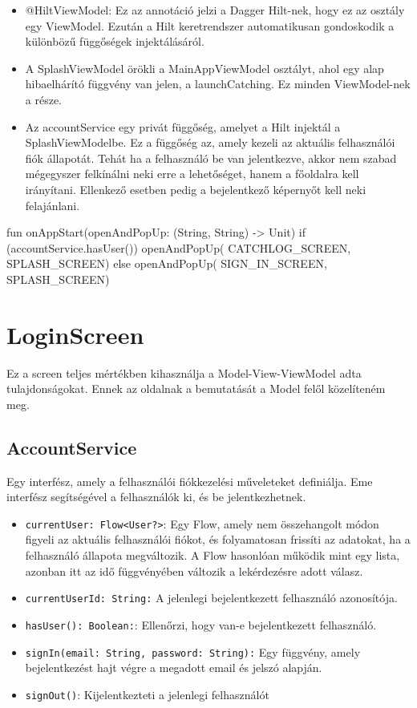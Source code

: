 \begin{itemize}
    \item @HiltViewModel: Ez az annotáció jelzi a Dagger Hilt-nek, hogy ez az osztály egy ViewModel. Ezután a Hilt keretrendszer automatikusan gondoskodik a különbözű függőségek injektálásáról.
    \item A SplashViewModel örökli a MainAppViewModel osztályt, ahol egy alap hibaelhárító függvény van jelen, a launchCatching. Ez minden ViewModel-nek a része.
    \item Az accountService egy privát függőség, amelyet a Hilt injektál a SplashViewModelbe.
    Ez a függőség az, amely kezeli az aktuális felhasználói fiók állapotát. Tehát ha a felhasználó be van jelentkezve, akkor nem szabad mégegyszer felkínálni neki erre a lehetőséget, hanem a főoldalra kell irányítani. Ellenkező esetben pedig a bejelentkező képernyőt kell neki felajánlani.
    
\end{itemize}

\begin{java}[caption = {onAppStart függvény deklarációja.}]
fun onAppStart(openAndPopUp: (String, String) -> Unit) {
    if (accountService.hasUser()) openAndPopUp(
    CATCHLOG_SCREEN, SPLASH_SCREEN)
    else openAndPopUp(
    SIGN_IN_SCREEN, SPLASH_SCREEN)
}
\end{java}

\section{LoginScreen}

Ez a screen teljes mértékben kihasználja a Model-View-ViewModel adta tulajdonságokat.
Ennek az oldalnak a bemutatását a Model felől közelíteném meg.

\subsection{AccountService}

Egy interfész, amely a felhasználói fiókkezelési műveleteket definiálja. Eme interfész segítségével a felhasználók ki, és be jelentkezhetnek.

\begin{itemize}
    \item \texttt{currentUser: Flow<User?>}: Egy Flow, amely nem összehangolt módon figyeli az aktuális felhasználói fiókot, és folyamatosan frissíti az adatokat, ha a felhasználó állapota megváltozik. A Flow hasonlóan működik mint egy lista, azonban itt az idő függvényében változik a lekérdezésre adott válasz.
    \item \texttt{currentUserId: String:} A jelenlegi bejelentkezett felhasználó azonosítója.
    \item \texttt{hasUser(): Boolean:}: Ellenőrzi, hogy van-e bejelentkezett felhasználó.
    \item \texttt{signIn(email: String, password: String):} Egy függvény, amely bejelentkezést hajt végre a megadott email és jelszó alapján.
    \item \texttt{signOut()}: Kijelentkezteti a jelenlegi felhasználót
\end{itemize}

